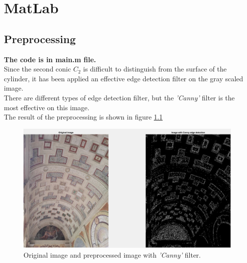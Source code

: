 \documentclass[a4paper, 11pt, oneside, openright, english]{book}
\begin{document}
\chapter{MatLab}
\section{Preprocessing}
\textbf{The code is in main.m file.}\\
Since the second conic $C_2$ is difficult to distinguish from the surface of the cylinder, 
it has been applied an effective edge detection filter on the gray scaled image.\\
There are different types of edge detection filter, but the \textit{'Canny'} filter is the most effective on this image.\\
The result of the preprocessing is shown in figure \ref{fig:preproccesing}
\begin{figure}[H]
    \centering
    \includegraphics[width=\textwidth]{../images/preprocessing.JPG}
    \caption{ Original image and preprocessed image with \textit{'Canny'} filter.}
    \label{fig:preproccesing}
\end{figure}
\end{document}
